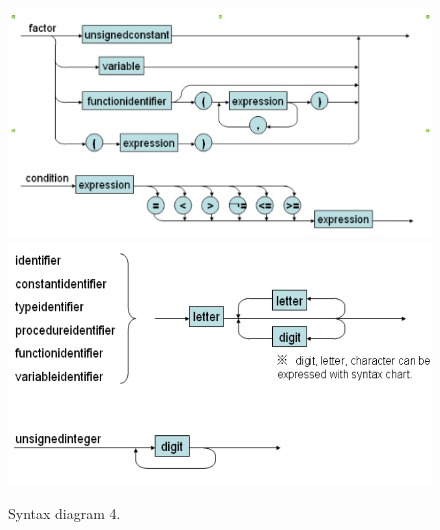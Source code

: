 \documentclass[12pt, a4paper]{report}
\begin{document}
				\begin{figure}[hp]
					\includegraphics[width=\linewidth]{syn7.png}
					\includegraphics[width=\linewidth]{syn8.png}
					\caption{Syntax diagram 4.}
					\label{fig:syn4}
				\end{figure}
\end{document}
